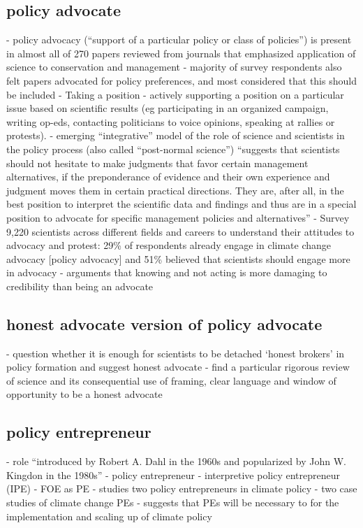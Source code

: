 \subsection{policy advocate}
\cite{ScottRLPAFSRSS2007} - policy advocacy (``support of a particular policy or class of policies'') is present in almost all of 270 papers reviewed from journals that emphasized application of science to conservation and management - majority of survey respondents also felt papers advocated for policy preferences, and most considered that this should be included
\cite{SteelLLS2004,SinghTKMMC2014} - Taking a position - actively supporting a position on a particular issue based on scientific results (eg participating in an organized campaign, writing op-eds, contacting politicians to voice opinions, speaking at rallies or protests).
\cite{SteelLLS2004} - emerging ``integrative'' model of the role of science and scientists in the policy process (also called ``post-normal science'') ``suggests that scientists should not hesitate to make judgments that favor certain management alternatives, if the preponderance of evidence and their own experience and judgment moves them in certain practical directions. They are, after all, in the best position to interpret the scientific data and findings and thus are in a special position to advocate for specific management policies and alternatives''
\cite{DablanderSCSBGGBAH2024} - Survey 9,220 scientists across different fields and careers to understand their attitudes to advocacy and protest: 29\% of respondents already engage in climate change advocacy [policy advocacy] and 51\% believed that scientists should engage more in advocacy
\cite{WyattGT2024} - arguments that knowing and not acting is more damaging to credibility than being an advocate

\subsection{honest advocate version of policy advocate}
\cite{GregoryBW2024} - question whether it is enough for scientists to be detached `honest brokers' in policy formation and suggest honest advocate
\cite{RoseBOP2018} - find a particular rigorous review of science and its consequential use of framing, clear language and window of opportunity to be a honest advocate

\subsection{policy entrepreneur}
\cite{vonMalmborg2024strategies} - \PE role ``introduced by Robert A. Dahl in the 1960s and popularized by John W. Kingdon in the 1980s''
\cite{Cairney2018} - policy entrepreneur
\cite{AukesLB2018} - interpretive policy entrepreneur (IPE)
\cite{CarterC2018} - FOE as PE
\cite{MintromL2017} - studies two policy entrepreneurs in climate policy
\cite{MintromL2017} - two case studies of climate change PEs
\cite{Green2017} - suggests that PEs will be necessary to for the implementation and scaling up of climate policy

